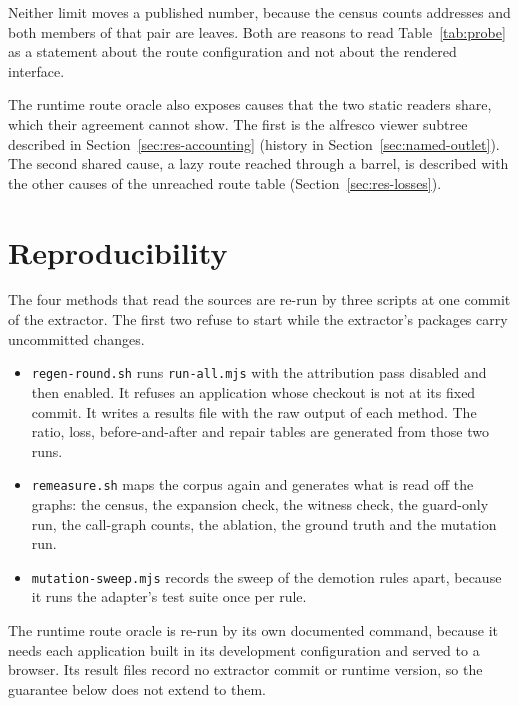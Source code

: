 Neither limit moves a published number, because the census counts addresses and both members of that
pair are leaves. Both are reasons to read Table~\ref{tab:probe} as a statement about the route
configuration and not about the rendered interface.

The runtime route oracle also exposes causes that the two static readers share, which their agreement
cannot show. The first is the alfresco viewer subtree described in Section~\ref{sec:res-accounting} (history in Section~\ref{sec:named-outlet}). The second shared cause, a lazy route reached through a barrel, is described with the
other causes of the unreached route table (Section~\ref{sec:res-losses}).


\section{Reproducibility}
\label{sec:reproducibility}

The four methods that read the sources are re-run by three scripts at one commit of the extractor.
The first two refuse to start while the extractor's packages carry uncommitted changes.
\begin{itemize}
\item \texttt{regen-round.sh} runs \texttt{run-all.mjs} with the attribution pass disabled and then
enabled. It refuses an application whose checkout is not at its fixed commit. It writes a results
file with the raw output of each method. The ratio, loss, before-and-after and repair tables are
generated from those two runs.
\item \texttt{remeasure.sh} maps the corpus again and generates what is read off the graphs: the
census, the expansion check, the witness check, the guard-only run, the call-graph counts, the
ablation, the ground truth and the mutation run.
\item \texttt{mutation-sweep.mjs} records the sweep of the demotion rules apart, because it runs the
adapter's test suite once per rule.
\end{itemize}

The runtime route oracle is re-run by its own documented command, because it needs each application
built in its development configuration and served to a browser. Its result files record no extractor
commit or runtime version, so the guarantee below does not extend to them.

